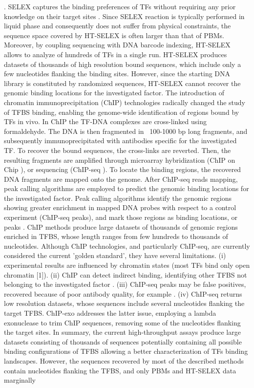 \documentclass[a4paper, titlepage, openright]{book}
\begin{document}
\citep{jolma2011methods,jolma2010multiplexed}. SELEX captures the binding preferences of TFs without requiring any prior knowledge on their target sites \citep{collas2008chop}. Since SELEX reaction is typically performed in liquid phase and consequently does not suffer from physical constraints, the sequence space covered by HT-SELEX is often larger than that of PBMs. Moreover, by coupling sequencing with DNA barcode indexing, HT-SELEX allows to analyze of hundreds of TFs in a single run. HT-SELEX produces datasets of thousands of high resolution bound sequences, which include only a few nucleotides flanking the binding sites. However, since the starting DNA library is constituted by randomized sequences, HT-SELEX cannot recover the genomic binding locations for the investigated factor. The introduction of chromatin immunoprecipitation (ChIP) technologies \citep{collas2008chop} radically changed the study of TFBS binding, enabling the genome-wide identification of regions bound by TFs in vivo. In ChIP the TF-DNA complexes are cross-linked using formaldehyde. The DNA is then fragmented in ~100-1000 bp long fragments, and subsequently immunoprecipitated with antibodies specific for the investigated TF. To recover the bound sequences, the cross-links are reverted. Then, the resulting fragments are amplified through microarray hybridization (ChIP on Chip \citep{collas2008chop,pillai2015chip}), or sequencing (ChIP-seq \citep{johnson2007genome,mardis2007chip}). To locate the binding regions, the recovered DNA fragments are mapped onto the genome. After ChIP-seq reads mapping, peak calling algorithms \citep{thomas2017features,guo2012high,zhang2008model} are employed to predict the genomic binding locations for the investigated factor. Peak calling algorithms identify the genomic regions showing greater enrichment in mapped DNA probes with respect to a control experiment (ChIP-seq peaks), and mark those regions as binding locations, or peaks \citep{pepke2009computation}. ChIP methods produce large datasets of thousands of genomic regions enriched in TFBS, whose length ranges from few hundreds to thousands of nucleotides. Although ChIP technologies, and particularly ChIP-seq, are currently considered the current 'golden standard', they have several limitations. (i) experimental results are influenced by chromatin states (most TFs bind only open chromatin [1]). (ii) ChIP can detect indirect binding, identifying other TFBS not belonging to the investigated factor \citep{worsley2014non}. (iii) ChIP-seq peaks may be false positives, recovered because of poor antibody quality, for example \citep{pickrell2011false}. (iv) ChIP-seq returns low resolution datasets, whose sequences include several nucleotides flanking the target TFBS. ChIP-exo \citep{rhee2011comprehensive} addresses the latter issue, employing a lambda exonuclease to trim ChIP sequences, removing some of the nucleotides flanking the target sites. In summary, the current high-throughput assays produce large datasets consisting of thousands of sequences potentially containing all possible binding configurations of TFBS allowing a better characterization of TFs binding landscapes. However, the sequences recovered by most of the described methods contain nucleotides flanking the TFBS, and only PBMs and HT-SELEX data marginally 
\end{document}
